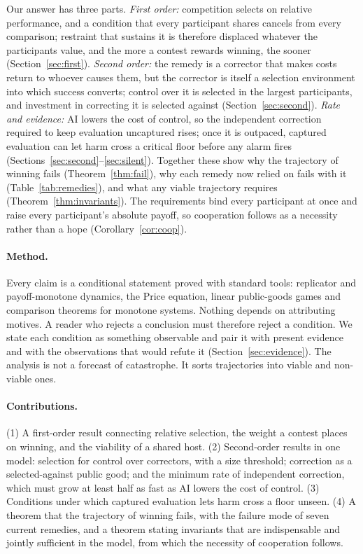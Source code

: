 \documentclass[letterpaper]{article} %
\theoremstyle{definition}
\begin{document}
Our answer has three parts. \emph{First order:} competition selects on relative performance, and a condition that every participant shares cancels from every comparison; restraint that sustains it is therefore displaced whatever the participants value, and the more a contest rewards winning, the sooner (Section~\ref{sec:first}). \emph{Second order:} the remedy is a corrector that makes costs return to whoever causes them, but the corrector is itself a selection environment into which success converts; control over it is selected in the largest participants, and investment in correcting it is selected against (Section~\ref{sec:second}). \emph{Rate and evidence:} AI lowers the cost of control, so the independent correction required to keep evaluation uncaptured rises; once it is outpaced, captured evaluation can let harm cross a critical floor before any alarm fires (Sections~\ref{sec:second}--\ref{sec:silent}). Together these show why the trajectory of winning fails (Theorem~\ref{thm:fail}), why each remedy now relied on fails with it (Table~\ref{tab:remedies}), and what any viable trajectory requires (Theorem~\ref{thm:invariants}). The requirements bind every participant at once and raise every participant's absolute payoff, so cooperation follows as a necessity rather than a hope (Corollary~\ref{cor:coop}).

\paragraph{Method.} Every claim is a conditional statement proved with standard tools: replicator and payoff-monotone dynamics, the Price equation, linear public-goods games and comparison theorems for monotone systems. Nothing depends on attributing motives. A reader who rejects a conclusion must therefore reject a condition. We state each condition as something observable and pair it with present evidence and with the observations that would refute it (Section~\ref{sec:evidence}). The analysis is not a forecast of catastrophe. It sorts trajectories into viable and non-viable ones.

\paragraph{Contributions.} (1) A first-order result connecting relative selection, the weight a contest places on winning, and the viability of a shared host. (2) Second-order results in one model: selection for control over correctors, with a size threshold; correction as a selected-against public good; and the minimum rate of independent correction, which must grow at least half as fast as AI lowers the cost of control. (3) Conditions under which captured evaluation lets harm cross a floor unseen. (4) A theorem that the trajectory of winning fails, with the failure mode of seven current remedies, and a theorem stating invariants that are indispensable and jointly sufficient in the model, from which the necessity of cooperation follows.
\end{document}
